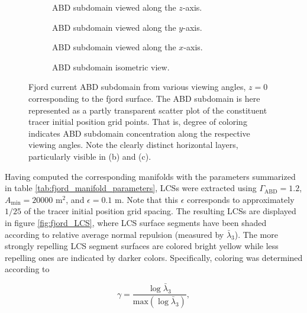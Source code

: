 \begin{figure}[h!]

\centering
\begin{subfigure}[b]{0.45\textwidth}
\centering

\caption{ABD subdomain viewed along the $z$-axis.}\label{fig:fjord_ABD_domain_a}
\end{subfigure}
\begin{subfigure}[b]{0.45\textwidth}
\centering

\caption{ABD subdomain viewed along the $y$-axis.}\label{fig:fjord_ABD_domain_b}
\end{subfigure}
\begin{subfigure}[b]{0.45\textwidth}
\centering

\caption{ABD subdomain viewed along the $x$-axis.}\label{fig:fjord_ABD_domain_c}
\end{subfigure}
\begin{subfigure}[b]{0.45\textwidth}
\centering

\caption{ABD subdomain isometric view.}\label{fig:fjord_ABD_domain_d}
\end{subfigure}

\caption{Fjord current ABD subdomain from various viewing angles, $z=0$ corresponding to the fjord surface. The ABD subdomain is here represented as a partly transparent scatter plot of the constituent tracer initial position grid points. That is, degree of coloring indicates ABD subdomain concentration along the respective viewing angles. Note the clearly distinct horizontal layers, particularly visible in (b) and (c).}\label{fig:fjord_ABD_domain} 
\end{figure}

Having computed the corresponding manifolds with the parameters summarized in table \ref{tab:fjord_manifold_parameters}, LCSs were extracted using $\Gamma_{\text{ABD}}=1.2$, $A_{\text{min}}=20000$ m$^2$, and $\epsilon=0.1$ m. Note that this $\epsilon$ corresponds to approximately $1/25$ of the tracer initial position grid spacing. The resulting LCSs are displayed in figure \ref{fig:fjord_LCS}, where LCS surface segments have been shaded according to relative average normal repulsion (measured by $\bar{\lambda}_3$). The more strongly repelling LCS segment surfaces are colored bright yellow while less repelling ones are indicated by darker colors. Specifically, coloring was determined according to

\begin{equation}
\gamma = \frac{\log \bar{\lambda}_3}{\text{max}(\log \bar{\lambda}_3)},
\end{equation}

